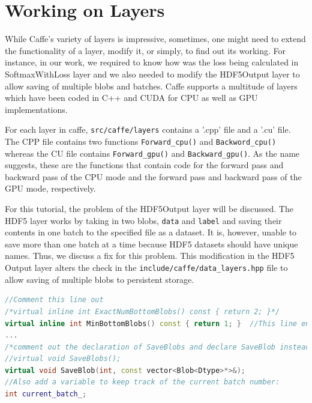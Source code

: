 \documentclass{article}
\begin{document}
\section{Working on Layers}
While Caffe's variety of layers is impressive, sometimes, one might need to extend the functionality of a layer, modify it, or simply, to find out its working. For instance, in our work, we required to know how was the loss being calculated in SoftmaxWithLoss layer and we also needed to modify the HDF5Output layer to allow saving of multiple blobs and batches. Caffe supports a multitude of layers which have been coded in C++ and CUDA for CPU as well as GPU implementations.
\par
For each layer in caffe, \verb|src/caffe/layers| contains a '.cpp' file and a '.cu' file. The CPP file contains two functions \verb|Forward_cpu()| and \verb|Backword_cpu()| whereas the CU file contains \verb|Forward_gpu()| and \verb|Backward_gpu()|. As the name suggests, these are the functions that contain code for the forward pass and backward pass of the CPU mode and the forward pass and backward pass of the GPU mode, respectively.
\par
For this tutorial, the problem of the HDF5Output layer will be discussed. The HDF5 layer works by taking in two blobs, \verb|data| and \verb|label| and saving their contents in one batch to the specified file as a dataset. It is, however, unable to save more than one batch at a time because HDF5 datasets should have unique names. Thus, we discuss a fix for this problem. This modification in the HDF5 Output layer alters the check in the \verb|include/caffe/data_layers.hpp| file to allow saving of multiple blobs to persistent storage.
\begin{lstlisting}[language=C++,breaklines]
//Comment this line out
/*virtual inline int ExactNumBottomBlobs() const { return 2; }*/  
virtual inline int MinBottomBlobs() const { return 1; }  //This line ensures multiple bottom blobs.
...
/*comment out the declaration of SaveBlobs and declare SaveBlob instead*/
//virtual void SaveBlobs();
virtual void SaveBlob(int, const vector<Blob<Dtype>*>&);
//Also add a variable to keep track of the current batch number:
int current_batch_;
\end{lstlisting}
\end{document}
